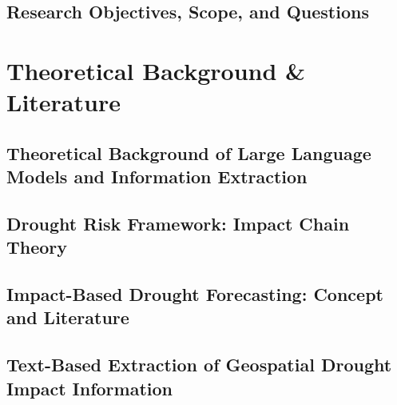 \documentclass[11pt, a4paper, oneside]{book}
\begin{document}
\section{Research Objectives, Scope, and Questions}



\chapter{Theoretical Background \& Literature}



\section{Theoretical Background of Large Language Models and Information Extraction}



\section{Drought Risk Framework: Impact Chain Theory}



\label{sec:impact_chain_theory}







\section{Impact-Based Drought Forecasting: Concept and Literature}
\label{sec:ibf_literature}



\section{Text-Based Extraction of Geospatial Drought Impact Information}
\label{sec:text_extraction}







\end{document}
